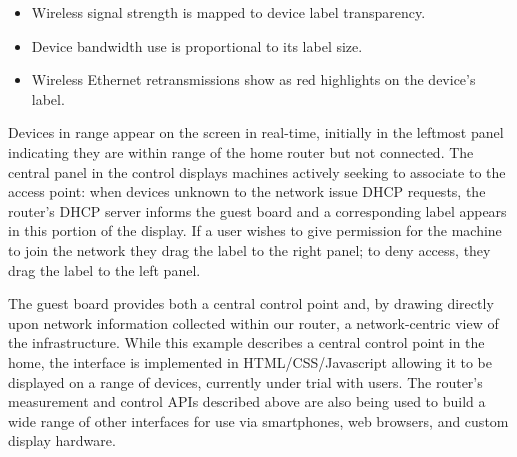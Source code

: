 \begin{itemize}
\vspace{-0.5em}
\item Wireless signal strength is mapped to device label transparency.
\item Device bandwidth use is proportional to its label size.
\item Wireless Ethernet retransmissions show as red highlights on the
      device's label. %
\end{itemize}

Devices in range appear on the screen in real-time, initially in the leftmost
panel indicating they are within range of the home router but not
connected.  The central panel in the control displays machines actively
seeking to associate to the access point:
when devices unknown to the network issue DHCP
requests, the router's DHCP server informs the guest board and a
corresponding label appears in this portion of the display.  If a user
wishes to give permission for the machine to join the network they
drag the label to the right panel; to deny access, they
drag the label to the left panel.

The guest board provides both a central control point and, by drawing
directly upon network information collected within our router, a
network-centric view of the infrastructure.  While this example
describes a central control point in the home, the interface is
implemented in HTML/CSS/Javascript allowing it to be displayed on a
range of devices, currently under trial with users.  The router's
measurement and control APIs described above are also being used to
build a wide range of other interfaces for use via smartphones, web
browsers, and custom display hardware.




